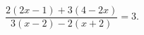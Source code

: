 \begin{ex}[type=equation]
	\begin{condition}
		$\dfrac{ 2(2x-1)+3(4-2x)}{3(x-2)-2(x+2)} = 3.$
	\end{condition}
\end{ex}